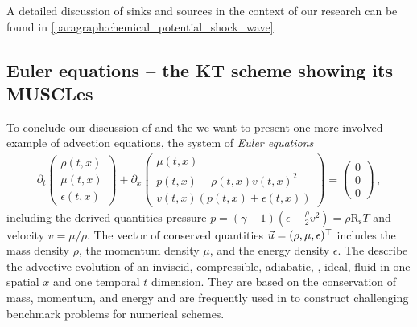A detailed discussion of sinks and sources in the context of our research can be found in \cref{paragraph:chemical_potential_shock_wave}.

\subsection{Euler equations -- the KT scheme showing its MUSCLes}\label{subsec:hydroEuler}
To conclude our discussion of \cfd{} and the \ktScheme{} we want to present one more involved example of advection equations, \viz{} the system of \textit{Euler equations}~\cite{Euler1757}
\begin{align}
\partial_t\begin{pmatrix}
	\rho(t,x)\\
	\mu(t,x)\\
	\epsilon(t,x)
\end{pmatrix}
+\partial_x
\begin{pmatrix}
 \mu(t,x)  \\
 p(t,x)+\rho(t,x)  v(t,x)^2 \\
 v(t,x) (p(t,x)+\epsilon(t,x) )
\end{pmatrix}
=\begin{pmatrix} 0 \\ 0 \\ 0 \end{pmatrix}\, ,\label{eq:euler}
\end{align}
including the derived quantities pressure $p=(\gamma-1)(\epsilon-\tfrac{\rho}{2}v^2)=\rho \mathrm{R}_\mathrm{s} T$ and velocity $v=\mu/\rho$.
The vector of conserved quantities $\vec{u}=(\rho,\mu,\epsilon)^\top$ includes the mass density $\rho$, the momentum density $\mu$, and the energy density $\epsilon$.
The \eulereqs{} describe the advective evolution of an inviscid, compressible, adiabatic, \ie{}, ideal, fluid in one spatial $x$ and one temporal $t$ dimension.
They are based on the conservation of mass, momentum, and energy and are frequently used in \cfd{} to construct challenging benchmark problems for numerical schemes.

